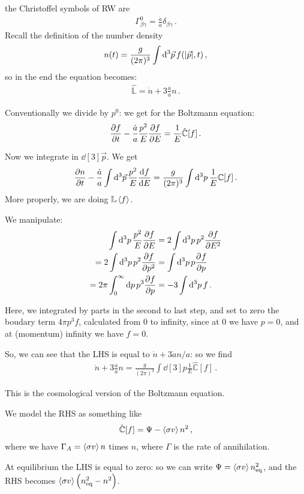 \documentclass[main.tex]{subfiles}
\begin{document}

the Christoffel symbols of RW are 
%
\begin{align}
  \Gamma^{0}_{\beta \gamma } = \frac{\dot{a}}{a} \delta_{\beta \gamma }
\,.
\end{align}
%
Recall the definition of the number density 
%
\begin{align}
  n(t) = \frac{g}{(2\pi )^3} \int  \dd[3]{\vec{p}} f(\abs{\vec{p}}, t) 
\,,
\end{align}
%
so in the end the equation becomes: 
%
\begin{align}
  \hat{\mathbb{L}} = \dot{n} + 3 \frac{\dot{a}}{a} n 
\,. 
\end{align}
%

Conventionally we divide by \(p^{0}\): we get for the Boltzmann equation: 
%
\begin{align}
  \pdv{f}{t} - \frac{\dot{a}}{a } \frac{p^2}{E} \pdv{f}{E} = \frac{1}{E} \hat{\mathbb{C}} [f]
\,.
\end{align}

Now we integrate in \(\dd[3]{\vec{p}}\). We get 
%
\begin{align}
  \pdv{n}{t} - \frac{\dot{a}}{a } \int  \dd[3]{\vec{p}} \frac{p^2}{E} \dv{f}{E} = \frac{g }{(2\pi )^3} \int  \dd[3]{p} \frac{1}{E} \mathbb{C} [f]  
\,.
\end{align}
%
More properly, we are doing \(\mathbb{L} \expval{f}\). 

We manipulate: 
%
\begin{align}
  \int \dd[3]{p} \frac{p^2}{E} \pdv{f}{E} 
  &= 2 \int \dd[3]{p} p^2 \pdv{f}{E^2} \\
  = 2 \int \dd[3]{p} p^2 \pdv{f}{p^2} 
  &= \int \dd[3]{p} p \pdv[]{f}{p} \\
  = 2 \pi \int_{0}^{ \infty } \dd{p} p^3 \pdv{f}{p} 
  &= -3 \int \dd[3]{p} f
\,.
\end{align}
%

Here, we integrated by parts in the second to last step, and set to zero the boudary term \(4 \pi p^3 f\), calculated from 0 to infinity, since at \(0\) we have \(p=0\), and at (momentum) infinity we have \(f=0\).

So, we can see that the LHS is equal to \(\dot{n} + 3 \dot{a}n/a \): so we find 
%
\begin{align}
  \dot{n} + 3 \frac{\dot{a}}{a} n = \frac{g}{(2 \pi )^3} \int \dd[3]{p} \frac{1}{E} \hat{\mathbb{C}} [f]
\,.
\end{align}

This is the cosmological version of the Boltzmann equation. 

We model the RHS as something like 
%
\begin{align}
  \hat{\mathbb{C}}[f] = \Psi - \expval{\sigma v } n^2
\,,
\end{align}
%
where we have \(\Gamma_A = \expval{\sigma v} n\) times \(n\), where \(\Gamma \) is the rate of annihilation. 

At equilibrium the LHS is equal to zero: so we can write \(\Psi = \expval{\sigma v} n^2 _{\text{eq}}\), and the RHS becomes \(\expval{\sigma v} \qty(n^2 _{\text{eq}} - n^2)\).
\end{document}

